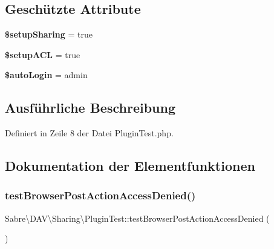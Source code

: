 \subsection*{Geschützte Attribute}
\begin{DoxyCompactItemize}
\item 
\mbox{\label{class_sabre_1_1_d_a_v_1_1_sharing_1_1_plugin_test_ae9bf96951886e26a2fdb6c6999ec3eb3}} 
{\bfseries \$setup\+Sharing} = true
\item 
\mbox{\label{class_sabre_1_1_d_a_v_1_1_sharing_1_1_plugin_test_aaf495ea7607fac18051fe049c6404afe}} 
{\bfseries \$setup\+A\+CL} = true
\item 
\mbox{\label{class_sabre_1_1_d_a_v_1_1_sharing_1_1_plugin_test_a1ccfe9ea7500f86378aaf4294efad262}} 
{\bfseries \$auto\+Login} = \textquotesingle{}admin\textquotesingle{}
\end{DoxyCompactItemize}


\subsection{Ausführliche Beschreibung}


Definiert in Zeile 8 der Datei Plugin\+Test.\+php.



\subsection{Dokumentation der Elementfunktionen}
\mbox{\label{class_sabre_1_1_d_a_v_1_1_sharing_1_1_plugin_test_a2db99e9375f88c6b1d479b46e9592b89}} 
\subsubsection{\texorpdfstring{test\+Browser\+Post\+Action\+Access\+Denied()}{testBrowserPostActionAccessDenied()}}
{\footnotesize\ttfamily Sabre\textbackslash{}\+D\+A\+V\textbackslash{}\+Sharing\textbackslash{}\+Plugin\+Test\+::test\+Browser\+Post\+Action\+Access\+Denied (\begin{DoxyParamCaption}{ }\end{DoxyParamCaption})}



